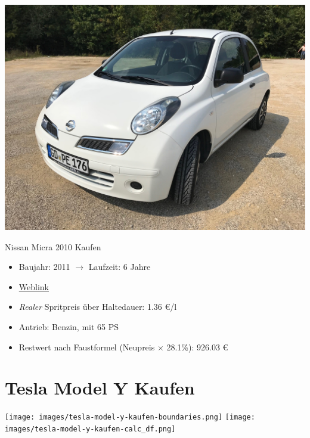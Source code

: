 \documentclass[landscape, DIV=99, 14pt]{scrartcl}
\begin{document}
\pagebreak
\null
\vspace{2cm}
\begin{center}
\includegraphics[width=0.9\columnwidth]{cars/nissan-micra.jpg}

Nissan Micra 2010 Kaufen
\end{center}

\begin{itemize}
    \item Baujahr: 2011 $\rightarrow$ Laufzeit: 6 Jahre
    \item \href{https://de.wikipedia.org/wiki/Nissan_Micra\#Micra_(K12,_2003%E2%80%932010)}{Weblink}
    \item \emph{Realer} Spritpreis \"uber Haltedauer: 1.36 \euro{}/l
    \item Antrieb: Benzin, mit 65 PS
    \item Restwert nach Faustformel (Neupreis $\times$ 28.1\%): 926.03 \euro{}
\end{itemize}

\pagebreak


\twocolumn

\section*{Tesla Model Y Kaufen}
\begin{center}
\texttt{[image: images/tesla-model-y-kaufen-boundaries.png]}
\null
\vspace{0.5cm}
\texttt{[image: images/tesla-model-y-kaufen-calc\_df.png]}
\end{center}
\end{document}
